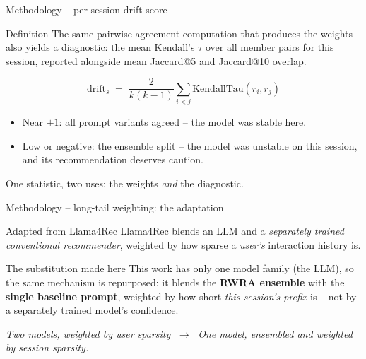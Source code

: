 \documentclass[aspectratio=169,12pt]{beamer}
\begin{document}
\begin{frame}{Methodology -- per-session drift score}
\begin{block}{Definition}
The same pairwise agreement computation that produces the weights also
yields a diagnostic: the mean Kendall's $\tau$ over all member pairs for
this session, reported alongside mean Jaccard@5 and Jaccard@10 overlap.
\end{block}

\vspace{0.7em}
\[
\text{drift}_s \;=\; \frac{2}{k(k-1)}\sum_{i<j} \mathrm{KendallTau}(r_i, r_j)
\]

\vspace{0.7em}
\begin{itemize}
  \item Near $+1$: all prompt variants agreed -- the model was stable here.
  \item Low or negative: the ensemble split -- the model was unstable on
        this session, and its recommendation deserves caution.
\end{itemize}

\vspace{0.4em}
\centering
\textcolor{DeepBlue}{One statistic, two uses: the weights \emph{and} the diagnostic.}
\end{frame}

\begin{frame}{Methodology -- long-tail weighting: the adaptation}
\begin{alertblock}{Adapted from Llama4Rec}
Llama4Rec blends an LLM and a \emph{separately trained conventional
recommender}, weighted by how sparse a \emph{user's} interaction history
is.
\end{alertblock}

\vspace{0.8em}
\begin{block}{The substitution made here}
This work has only one model family (the LLM), so the same mechanism is
repurposed: it blends the \textbf{RWRA ensemble} with the \textbf{single
baseline prompt}, weighted by how short \emph{this session's prefix} is --
not by a separately trained model's confidence.
\end{block}

\vspace{0.5em}
\centering
\textcolor{DeepBlue}{\emph{Two models, weighted by user sparsity}
$\;\longrightarrow\;$
\emph{One model, ensembled and weighted by session sparsity.}}
\end{frame}
\end{document}
